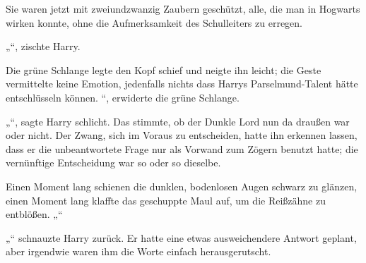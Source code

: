 Sie waren jetzt mit zweiundzwanzig Zaubern geschützt, alle, die man in Hogwarts wirken konnte, ohne die Aufmerksamkeit des Schulleiters zu erregen.

„“, zischte Harry.

Die grüne Schlange legte den Kopf schief und neigte ihn leicht; die Geste vermittelte keine Emotion, jedenfalls nichts dass Harrys Parselmund-Talent hätte entschlüsseln können. “, erwiderte die grüne Schlange.

„“, sagte Harry schlicht. Das stimmte, ob der Dunkle Lord nun da draußen war oder nicht. Der Zwang, sich im Voraus zu entscheiden, hatte ihn erkennen lassen, dass er die unbeantwortete Frage nur als Vorwand zum Zögern benutzt hatte; die vernünftige Entscheidung war so oder so dieselbe.

Einen Moment lang schienen die dunklen, bodenlosen Augen schwarz zu glänzen, einen Moment lang klaffte das geschuppte Maul auf, um die Reißzähne zu entblößen. „“

„“ schnauzte Harry zurück. Er hatte eine etwas ausweichendere Antwort geplant, aber irgendwie waren ihm die Worte einfach herausgerutscht.


